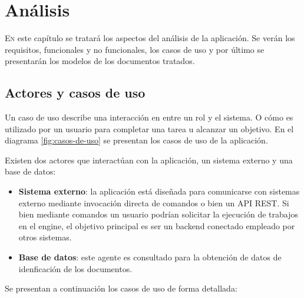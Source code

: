 
\chapter{Análisis}
\label{chap:analisis}

\lettrine{E}{n} este capítulo se tratará los aspectos del análisis de la aplicación. Se verán los requisitos, funcionales y no funcionales, los casos de uso y por último se presentarán los modelos de los documentos tratados.

\section{Actores y casos de uso}

Un caso de uso describe una interacción en entre un rol y el sistema. O cómo es utilizado por un usuario para completar una tarea u alcanzar un objetivo. En el diagrama \ref{fig:casos-de-uso} se presentan los casos de uso de la aplicación. 

Existen dos actores que interactúan con la aplicación, un sistema externo y una base de datos:

\begin{itemize}
	\item \textbf{Sistema externo}: la aplicación está diseñada para comunicarse con sistemas externo mediante invocación directa de comandos o bien un API REST. Si bien mediante comandos un usuario podrían solicitar la ejecución de trabajos en el engine, el objetivo principal es ser un backend conectado empleado por otros sistemas.
	\item \textbf{Base de datos}: este agente es consultado para la obtención de datos de idenficación de los documentos.
\end{itemize}

Se presentan a continuación los casos de uso de forma detallada:

